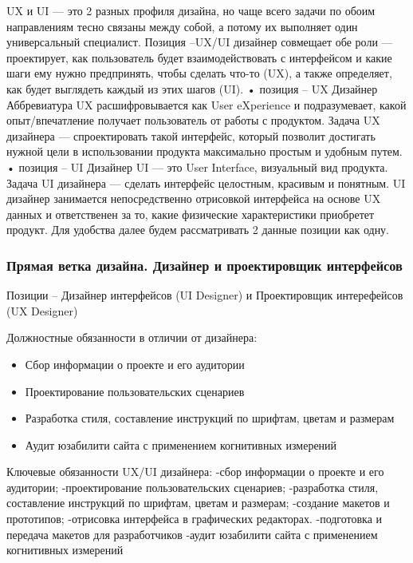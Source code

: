 \documentclass{../industrial-development}
\begin{document}
\lecturenotes
UX и UI — это 2 разных профиля дизайна, но чаще всего задачи по обоим направлениям тесно связаны между собой, а потому их выполняет один универсальный специалист.
Позиция –UX/UI дизайнер совмещает обе роли — проектирует, как пользователь будет взаимодействовать с интерфейсом и какие шаги ему нужно предпринять, чтобы сделать что-то (UX), а также определяет, как будет выглядеть каждый из этих шагов (UI).
•	позиция – UX Дизайнер
Аббревиатура UX расшифровывается как User eXperience и подразумевает, какой опыт/впечатление получает пользователь от работы с продуктом. Задача UX дизайнера — спроектировать такой интерфейс, который позволит достигать нужной цели в использовании продукта максимально простым и удобным путем.
•	позиция – UI Дизайнер
UI — это User Interface, визуальный вид продукта. Задача UI дизайнера — сделать интерфейс целостным, красивым и понятным. UI дизайнер занимается непосредственно отрисовкой интерфейса на основе UX данных и ответственен за то, какие физические характеристики приобретет продукт.
Для удобства далее будем рассматривать 2 данные позиции как одну.

\begin{frame} \frametitle{Прямая ветка дизайна. Дизайнер и проектировщик интерфейсов }
 \begin{block}{}
  \alert{Позиции – Дизайнер интерфейсов (UI Designer) и Проектировщик интерефейсов (UX Designer)}

Должностные обязанности в отличии от дизайнера: 
  \end{block}
  \begin{itemize}
  \item   Сбор информации о проекте и его аудитории
  \item  Проектирование пользовательских сценариев
  \item Разработка стиля, составление инструкций по шрифтам, цветам и размерам
 \item Аудит юзабилити сайта с применением когнитивных измерений
  \end{itemize}
\end{frame}

\lecturenotes
Ключевые обязанности UX/UI дизайнера:
-сбор информации о проекте и его аудитории;
-проектирование пользовательских сценариев;
-разработка стиля, составление инструкций по шрифтам, цветам и размерам;
-создание макетов и прототипов;
-отрисовка интерфейса в графических редакторах.
-подготовка и передача макетов для разработчиков
-аудит юзабилити сайта с применением когнитивных измерений
\end{document}
